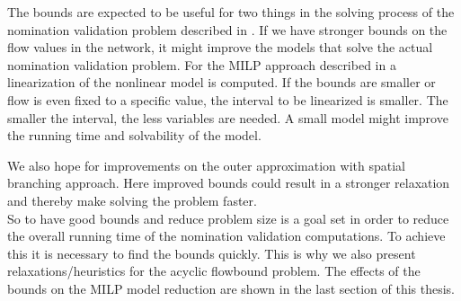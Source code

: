 The bounds are expected to be useful for two things in the solving process of the nomination validation problem 
described in \cite{PfetschFuegenschuhGeissleretal.2012}. If we have stronger bounds on the flow values in the network, 
it might improve the models that solve the actual nomination validation problem. 
For the MILP approach described in \cite{PfetschFuegenschuhGeissleretal.2012} a linearization of the 
nonlinear model is computed. If the bounds are smaller or flow is even fixed to a specific value, the interval to be 
linearized is smaller. The smaller the interval, the less variables are needed. A small model might improve the running 
time and solvability of the model.

We also hope for improvements on the outer approximation with spatial branching approach. Here improved bounds could 
result in a stronger relaxation and thereby make solving the problem faster. \\

So to have good bounds and reduce problem size is a goal set in order to reduce the overall running time of the 
nomination validation computations. To achieve this it is necessary to find the bounds quickly. This is why we also 
present relaxations/heuristics for the acyclic flowbound problem. The effects of the bounds on the MILP model reduction 
are shown in the last section of this thesis.





